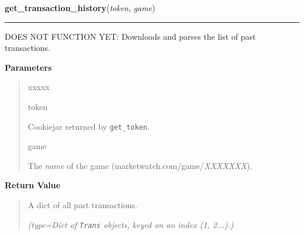 \hspace{.8\funcindent}\begin{boxedminipage}{\funcwidth}

    \raggedright \textbf{get\_transaction\_history}(\textit{token}, \textit{game})

    \vspace{-1.5ex}

    \rule{\textwidth}{0.5\fboxrule}
\setlength{\parskip}{2ex}
    DOES NOT FUNCTION YET: Downloads and parses the list of past 
    transactions.

\setlength{\parskip}{1ex}
      \textbf{Parameters}
      \vspace{-1ex}

      \begin{quote}
        \begin{Ventry}{xxxxx}

          \item[token]

          Cookiejar returned by \texttt{get\_token}.

          \item[game]

          The \textit{name} of the game 
          (marketwatch.com/game/\textit{XXXXXXX}).

        \end{Ventry}

      \end{quote}

      \textbf{Return Value}
    \vspace{-1ex}

      \begin{quote}
      A dict of all past transactions.

      {\it (type=Dict of \texttt{Trans} objects, keyed on an index (1, 2...).)}

      \end{quote}

    \end{boxedminipage}

    \label{moira:order}

    \vspace{0.5ex}

